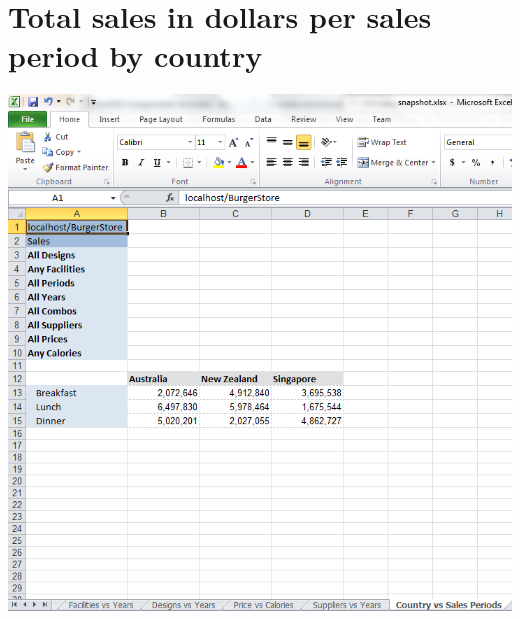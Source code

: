 \documentclass[11pt, a4paper]{article}
\begin{document}
\section{Total sales in dollars per sales period by country}
\includegraphics[width=15cm]{diagrams/CountryVsSalesPeriod}
\end{document}
